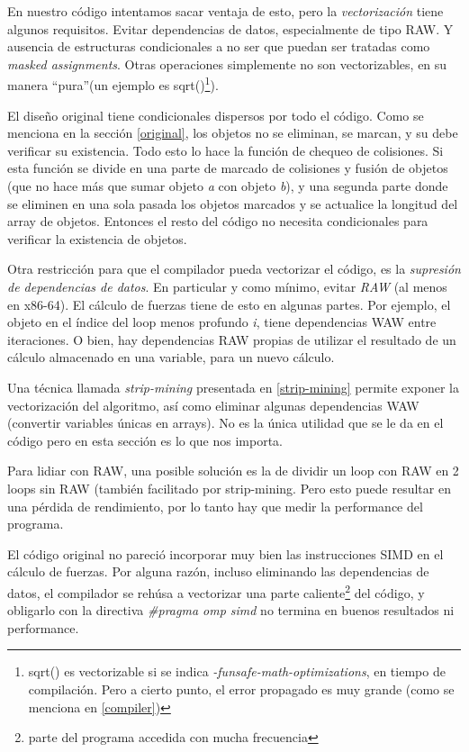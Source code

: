 \documentclass{article}
\begin{document}
En nuestro código intentamos sacar ventaja de esto, pero la \textit{vectorización} tiene algunos requisitos.
Evitar dependencias de datos, especialmente de tipo RAW. Y ausencia de estructuras condicionales a no ser
que puedan ser tratadas como \textit{masked assignments}. Otras operaciones simplemente no son vectorizables,
en su manera ``pura''(un ejemplo es sqrt()\footnote{sqrt() es vectorizable si se indica \textit{-funsafe-math-optimizations},
en tiempo de compilación. Pero a cierto punto, el error propagado es muy grande (como se menciona en \ref{compiler})}).


El diseño original tiene condicionales dispersos por todo el código. Como se menciona en
la sección \ref{original}, los objetos no se eliminan, se marcan, y su debe verificar su existencia.
Todo esto lo hace la función de chequeo de colisiones. Si esta función se divide en una parte de marcado
de colisiones y fusión de objetos (que no hace más que sumar objeto \textit{a} con objeto \textit{b}), y
una segunda parte donde se eliminen en una sola pasada los objetos marcados y se actualice la longitud
del array de objetos. Entonces el resto del código no necesita condicionales para verificar la existencia de objetos.


Otra restricción para que el compilador pueda vectorizar el código, es la \textit{supresión de dependencias de datos}.
En particular y como mínimo, evitar \textit{RAW} (al menos en x86-64). El cálculo de fuerzas tiene de esto en algunas
partes. Por ejemplo, el objeto en el índice del loop menos profundo \textit{i}, tiene dependencias WAW entre iteraciones.
O bien, hay dependencias RAW propias de utilizar el resultado de un cálculo almacenado en una variable, para un nuevo cálculo.


Una técnica llamada \textit{strip-mining} presentada en \ref{strip-mining} permite exponer la vectorización
del algoritmo, así como eliminar algunas dependencias WAW (convertir variables únicas en arrays). No es
la única utilidad que se le da en el código pero en esta sección es lo que nos importa.


Para lidiar con RAW, una posible solución es la de dividir un loop con RAW en 2 loops sin RAW (también
facilitado por strip-mining. Pero esto puede resultar en una pérdida de rendimiento, por lo tanto
hay que medir la performance del programa.


El código original no pareció incorporar muy bien las instrucciones SIMD en el cálculo de fuerzas.
Por alguna razón, incluso eliminando las dependencias de datos, el compilador se rehúsa a vectorizar
una parte caliente\footnote{parte del programa accedida con mucha frecuencia} del código, y obligarlo
con la directiva \textit{\#pragma omp simd} no termina en buenos resultados ni performance.
\end{document}
